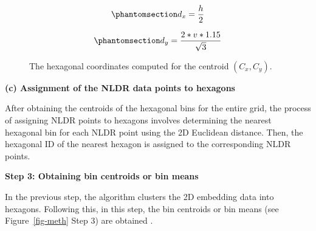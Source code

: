 \documentclass[
  12pt]{article}
\begin{document}
\begin{equation}\phantomsection\label{eq-equation15}{
d_x = \frac{h}{2}
}\end{equation}

\begin{equation}\phantomsection\label{eq-equation16}{
d_y = \frac{2* v * 1.15}{\sqrt{3}} 
}\end{equation}

\begin{figure}[H]


\caption{\label{fig-hexcoord}The hexagonal coordinates computed for the
centroid \((C_x, C_y)\).}

\end{figure}%

\textbf{(c) Assignment of the NLDR data points to hexagons}

After obtaining the centroids of the hexagonal bins for the entire grid,
the process of assigning NLDR points to hexagons involves determining
the nearest hexagonal bin for each NLDR point using the 2D Euclidean
distance. Then, the hexagonal ID of the nearest hexagon is assigned to
the corresponding NLDR points.

\textbf{Step 3: Obtaining bin centroids or bin means}

In the previous step, the algorithm clusters the 2D embedding data into
hexagons. Following this, in this step, the bin centroids or bin means
(see Figure~\ref{fig-meth} Step 3) are obtained \citep{Carr2013}.
\end{document}
